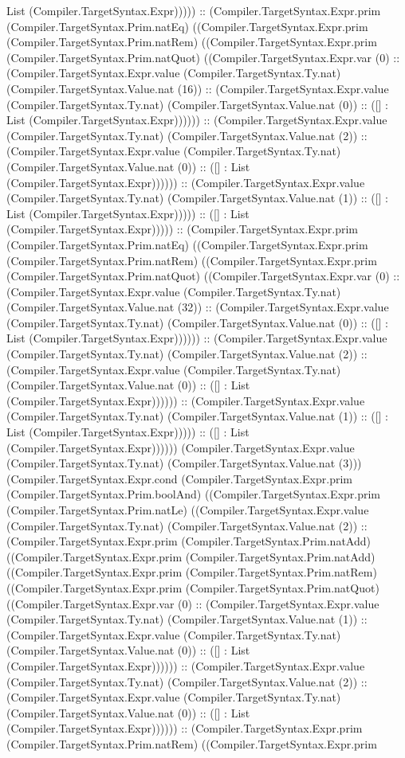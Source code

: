 \documentclass[11pt]{article}
\begin{document}
List (Compiler.TargetSyntax.Expr))))) :: (Compiler.TargetSyntax.Expr.prim (Compiler.TargetSyntax.Prim.natEq) ((Compiler.TargetSyntax.Expr.prim (Compiler.TargetSyntax.Prim.natRem) ((Compiler.TargetSyntax.Expr.prim (Compiler.TargetSyntax.Prim.natQuot) ((Compiler.TargetSyntax.Expr.var (0) :: (Compiler.TargetSyntax.Expr.value (Compiler.TargetSyntax.Ty.nat) (Compiler.TargetSyntax.Value.nat (16)) :: (Compiler.TargetSyntax.Expr.value (Compiler.TargetSyntax.Ty.nat) (Compiler.TargetSyntax.Value.nat (0)) :: ([] : List (Compiler.TargetSyntax.Expr)))))) :: (Compiler.TargetSyntax.Expr.value (Compiler.TargetSyntax.Ty.nat) (Compiler.TargetSyntax.Value.nat (2)) :: (Compiler.TargetSyntax.Expr.value (Compiler.TargetSyntax.Ty.nat) (Compiler.TargetSyntax.Value.nat (0)) :: ([] : List (Compiler.TargetSyntax.Expr)))))) :: (Compiler.TargetSyntax.Expr.value (Compiler.TargetSyntax.Ty.nat) (Compiler.TargetSyntax.Value.nat (1)) :: ([] : List (Compiler.TargetSyntax.Expr))))) :: ([] : List (Compiler.TargetSyntax.Expr))))) :: (Compiler.TargetSyntax.Expr.prim (Compiler.TargetSyntax.Prim.natEq) ((Compiler.TargetSyntax.Expr.prim (Compiler.TargetSyntax.Prim.natRem) ((Compiler.TargetSyntax.Expr.prim (Compiler.TargetSyntax.Prim.natQuot) ((Compiler.TargetSyntax.Expr.var (0) :: (Compiler.TargetSyntax.Expr.value (Compiler.TargetSyntax.Ty.nat) (Compiler.TargetSyntax.Value.nat (32)) :: (Compiler.TargetSyntax.Expr.value (Compiler.TargetSyntax.Ty.nat) (Compiler.TargetSyntax.Value.nat (0)) :: ([] : List (Compiler.TargetSyntax.Expr)))))) :: (Compiler.TargetSyntax.Expr.value (Compiler.TargetSyntax.Ty.nat) (Compiler.TargetSyntax.Value.nat (2)) :: (Compiler.TargetSyntax.Expr.value (Compiler.TargetSyntax.Ty.nat) (Compiler.TargetSyntax.Value.nat (0)) :: ([] : List (Compiler.TargetSyntax.Expr)))))) :: (Compiler.TargetSyntax.Expr.value (Compiler.TargetSyntax.Ty.nat) (Compiler.TargetSyntax.Value.nat (1)) :: ([] : List (Compiler.TargetSyntax.Expr))))) :: ([] : List (Compiler.TargetSyntax.Expr)))))) (Compiler.TargetSyntax.Expr.value (Compiler.TargetSyntax.Ty.nat) (Compiler.TargetSyntax.Value.nat (3))) (Compiler.TargetSyntax.Expr.cond (Compiler.TargetSyntax.Expr.prim (Compiler.TargetSyntax.Prim.boolAnd) ((Compiler.TargetSyntax.Expr.prim (Compiler.TargetSyntax.Prim.natLe) ((Compiler.TargetSyntax.Expr.value (Compiler.TargetSyntax.Ty.nat) (Compiler.TargetSyntax.Value.nat (2)) :: (Compiler.TargetSyntax.Expr.prim (Compiler.TargetSyntax.Prim.natAdd) ((Compiler.TargetSyntax.Expr.prim (Compiler.TargetSyntax.Prim.natAdd) ((Compiler.TargetSyntax.Expr.prim (Compiler.TargetSyntax.Prim.natRem) ((Compiler.TargetSyntax.Expr.prim (Compiler.TargetSyntax.Prim.natQuot) ((Compiler.TargetSyntax.Expr.var (0) :: (Compiler.TargetSyntax.Expr.value (Compiler.TargetSyntax.Ty.nat) (Compiler.TargetSyntax.Value.nat (1)) :: (Compiler.TargetSyntax.Expr.value (Compiler.TargetSyntax.Ty.nat) (Compiler.TargetSyntax.Value.nat (0)) :: ([] : List (Compiler.TargetSyntax.Expr)))))) :: (Compiler.TargetSyntax.Expr.value (Compiler.TargetSyntax.Ty.nat) (Compiler.TargetSyntax.Value.nat (2)) :: (Compiler.TargetSyntax.Expr.value (Compiler.TargetSyntax.Ty.nat) (Compiler.TargetSyntax.Value.nat (0)) :: ([] : List (Compiler.TargetSyntax.Expr)))))) :: (Compiler.TargetSyntax.Expr.prim (Compiler.TargetSyntax.Prim.natRem) ((Compiler.TargetSyntax.Expr.prim 
\end{document}
